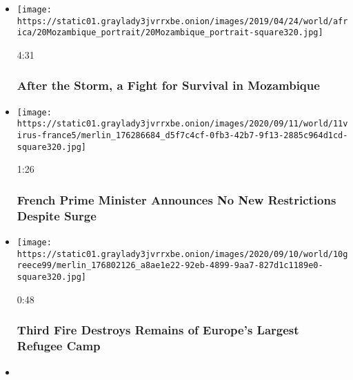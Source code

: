 \begin{itemize}
\item
  \href{https://www.nytimes3xbfgragh.onion/video/world/africa/100000006439514/mozambique-flood-cyclone-idai.html?action=click\&module=video-series-bar\&region=header\&pgtype=Article\&playlistId=video/world}{}

  \texttt{[image: https://static01.graylady3jvrrxbe.onion/images/2019/04/24/world/africa/20Mozambique\_portrait/20Mozambique\_portrait-square320.jpg]}

  4:31

  \hypertarget{after-the-storm-a-fight-for-survival-in-mozambique}{%
  \subsubsection{After the Storm, a Fight for Survival in
  Mozambique}\label{after-the-storm-a-fight-for-survival-in-mozambique}}
\item
  \href{https://www.nytimes3xbfgragh.onion/video/world/europe/100000007336352/france-coronavirus-testing.html?action=click\&module=video-series-bar\&region=header\&pgtype=Article\&playlistId=video/world}{}

  \texttt{[image: https://static01.graylady3jvrrxbe.onion/images/2020/09/11/world/11virus-france5/merlin\_176286684\_d5f7c4cf-0fb3-42b7-9f13-2885c964d1cd-square320.jpg]}

  1:26

  \hypertarget{french-prime-minister-announces-no-new-restrictions-despite-surge}{%
  \subsubsection{French Prime Minister Announces No New Restrictions
  Despite
  Surge}\label{french-prime-minister-announces-no-new-restrictions-despite-surge}}
\item
  \href{https://www.nytimes3xbfgragh.onion/video/world/europe/100000007333605/greece-moria-refugee-camp-fires.html?action=click\&module=video-series-bar\&region=header\&pgtype=Article\&playlistId=video/world}{}

  \texttt{[image: https://static01.graylady3jvrrxbe.onion/images/2020/09/10/world/10greece99/merlin\_176802126\_a8ae1e22-92eb-4899-9aa7-827d1c1189e0-square320.jpg]}

  0:48

  \hypertarget{third-fire-destroys-remains-of-europes-largest-refugee-camp}{%
  \subsubsection{Third Fire Destroys Remains of Europe's Largest Refugee
  Camp}\label{third-fire-destroys-remains-of-europes-largest-refugee-camp}}
\item
  \href{https://www.nytimes3xbfgragh.onion/video/world/europe/100000007333350/beirut-port-explosion.html?action=click\&module=video-series-bar\&region=header\&pgtype=Article\&playlistId=video/world}{}


\end{itemize}
